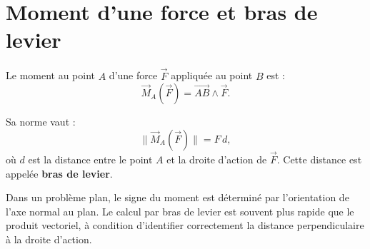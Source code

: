 \section{Moment d'une force et bras de levier}

Le moment au point $A$ d'une force $\vec F$ appliquée au point $B$ est :
\[
\vec M_A(\vec F)=\overrightarrow{AB}\wedge\vec F.
\]

Sa norme vaut :
\[
\|\vec M_A(\vec F)\|=F\,d,
\]
où $d$ est la distance entre le point $A$ et la droite d'action de $\vec F$. Cette distance est appelée \textbf{bras de levier}.

\TLForceMoment

Dans un problème plan, le signe du moment est déterminé par l'orientation de l'axe normal au plan. Le calcul par bras de levier est souvent plus rapide que le produit vectoriel, à condition d'identifier correctement la distance perpendiculaire à la droite d'action.
